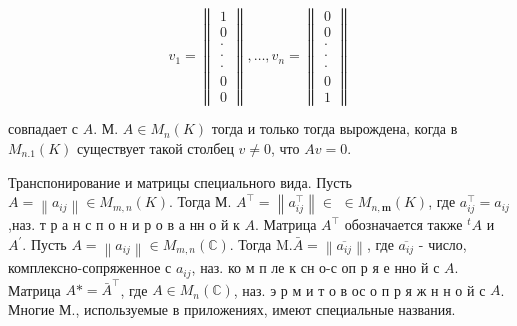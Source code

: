 \documentclass[10pt]{article}
\begin{document}
\[

v_{1}=\left\|\begin{array}{l}

1 \\

0 \\

\cdot \\

\cdot \\

\cdot \\

0 \\

0

\end{array}\right\|, \ldots, v_{n}=\left\|\begin{array}{l}

0 \\

0 \\

\cdot \\

\cdot \\

\cdot \\

0 \\

1

\end{array}\right\|

\]



совпадает с $A$. М. $A \in M_{n}(K)$ тогда и только тогда вырождена, когда в $M_{n .1}(K)$ существует такой столбец $v \neq 0$, что $A v=0$.



Транспонирование и матрицы специального вида. Пусть $A=\left\|a_{i j}\right\| \in M_{m, n}(K)$. Тогда М. $A^{\top}=\left\|a_{i j}^{\top}\right\| \in$ $\in M_{n, \boldsymbol{m}}(K)$, где $a_{i j}^{\top}=a_{i j}$,наз. т р а н с п о н и р о в а нн о й к $A$. Матрица $A^{\top}$ обозначается также ${ }^{t} A$ и $A^{\prime}$. Пусть $A=\left\|a_{i j}\right\| \in M_{m, n}(\mathbb{C})$. Тогда $\mathrm{M} . \bar{A}=\left\|\overline{a_{i j}}\right\|$, где $\overline{a_{i j}}$ - число, комплексно-сопряженное с $a_{i j}$, наз. ко м п ле к сн о-с оп р я е нно й с $A$. Матрица $A *=\bar{A}^{\top}$, где $A \in M_{n}(\mathbb{C})$, наз. э р м и т о в ос о п р я ж н н о й с $A$. Многие М., используемые в приложениях, имеют специальные названия.
\end{document}

